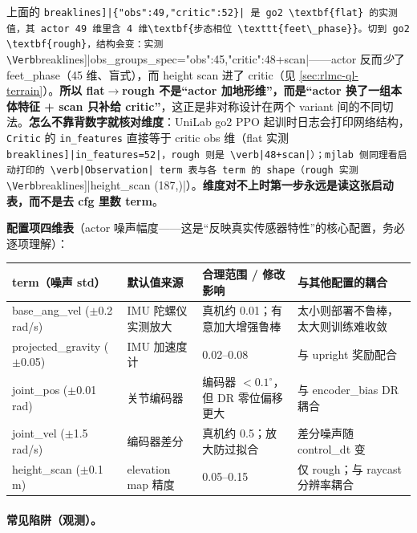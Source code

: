 \begin{note}
上面的 \Verb[breaklines]|{"obs":49,"critic":52}| 是 go2 \textbf{flat} 的实测值，其 actor 49 维里含 4 维\textbf{步态相位 \texttt{feet\_phase}}。切到 go2 \textbf{rough}，结构会变：实测 \Verb[breaklines]|obs_groups_spec={"obs":45,"critic":48+scan}|——actor 反而\emph{少}了 feet\_phase（45 维、盲式），而 height scan 进了 critic（见 \cref{sec:rlmc-ql-terrain}）。\textbf{所以 flat$\to$rough 不是“actor 加地形维”，而是“actor 换了一组本体特征 + scan 只补给 critic”}，这正是非对称设计在两个 variant 间的不同切法。\textbf{怎么不靠背数字就核对维度}：UniLab go2 PPO 起训时日志会打印网络结构，\verb|Critic| 的 \verb|in_features| 直接等于 critic obs 维（flat 实测 \Verb[breaklines]|in_features=52|，rough 则是 \verb|48+scan|）；mjlab 侧同理看启动打印的 \verb|Observation| term 表与各 term 的 shape（rough 实测 \Verb[breaklines]|height_scan (187,)|）。\textbf{维度对不上时第一步永远是读这张启动表，而不是去 cfg 里数 term}。
\end{note}

\textbf{配置项四维表}（actor 噪声幅度——这是“反映真实传感器特性”的核心配置，务必逐项理解）：

\begin{center}
\small
\begin{tabularx}{\linewidth}{@{}LlLp{4.6cm}@{}}
\toprule
term（噪声 std） & 默认值来源 & 合理范围 / 修改影响 & 与其他配置的耦合 \\
\midrule
base\_ang\_vel ($\pm$0.2 rad/s) & IMU 陀螺仪实测放大 & 真机约 0.01；有意加大增强鲁棒 & 太小则部署不鲁棒，太大则训练难收敛 \\
projected\_gravity ($\pm$0.05) & IMU 加速度计 & 0.02--0.08 & 与 upright 奖励配合 \\
joint\_pos ($\pm$0.01 rad) & 关节编码器 & 编码器 $<0.1^\circ$，但 DR 零位偏移更大 & 与 encoder\_bias DR 耦合 \\
joint\_vel ($\pm$1.5 rad/s) & 编码器差分 & 真机约 0.5；放大防过拟合 & 差分噪声随 control\_dt 变 \\
height\_scan ($\pm$0.1 m) & elevation map 精度 & 0.05--0.15 & 仅 rough；与 raycast 分辨率耦合 \\
\bottomrule
\end{tabularx}
\end{center}

\paragraph{常见陷阱（观测）。}

